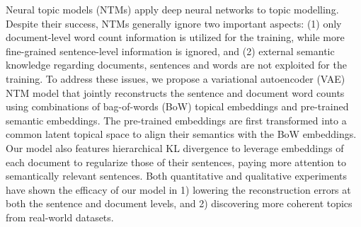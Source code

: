 Neural topic models (NTMs) apply deep neural networks to topic modelling. Despite their success, NTMs generally ignore two important aspects: (1) only document-level word count information is utilized for the training, while more fine-grained sentence-level information is ignored, and (2) external semantic knowledge regarding documents, sentences and words are not exploited for the training. To address these issues, we propose a variational autoencoder (VAE) NTM model that jointly reconstructs the sentence and document word counts using combinations of bag-of-words (BoW) topical embeddings and pre-trained semantic embeddings. The pre-trained embeddings are first transformed into a common latent topical space to align their semantics with the BoW embeddings. Our model also features hierarchical KL divergence to leverage embeddings of each document to regularize those of their sentences, paying more attention to semantically relevant sentences. Both quantitative and qualitative experiments have shown the efficacy of our model in 1) lowering the reconstruction errors at both the sentence and document levels, and 2) discovering more coherent topics from real-world datasets.
